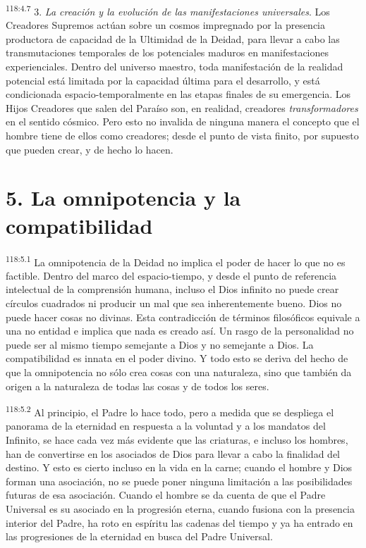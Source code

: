 \documentclass[twoside, 11pt]{book}
\begin{document}
\par
\textsuperscript{118:4.7} 3. \textit{La creación y la evolución de las manifestaciones universales}. Los Creadores Supremos actúan sobre un cosmos impregnado por la presencia productora de capacidad de la Ultimidad de la Deidad, para llevar a cabo las transmutaciones temporales de los potenciales maduros en manifestaciones experienciales. Dentro del universo maestro, toda manifestación de la realidad potencial está limitada por la capacidad última para el desarrollo, y está condicionada espacio-temporalmente en las etapas finales de su emergencia. Los Hijos Creadores que salen del Paraíso son, en realidad, creadores \textit{transformadores} en el sentido cósmico. Pero esto no invalida de ninguna manera el concepto que el hombre tiene de ellos como creadores; desde el punto de vista finito, por supuesto que pueden crear, y de hecho lo hacen.

\section*{5. La omnipotencia y la compatibilidad}
\par
\textsuperscript{118:5.1} La omnipotencia de la Deidad no implica el poder de hacer lo que no es factible. Dentro del marco del espacio-tiempo, y desde el punto de referencia intelectual de la comprensión humana, incluso el Dios infinito no puede crear círculos cuadrados ni producir un mal que sea inherentemente bueno. Dios no puede hacer cosas no divinas. Esta contradicción de términos filosóficos equivale a una no entidad e implica que nada es creado así. Un rasgo de la personalidad no puede ser al mismo tiempo semejante a Dios y no semejante a Dios. La compatibilidad es innata en el poder divino. Y todo esto se deriva del hecho de que la omnipotencia no sólo crea cosas con una naturaleza, sino que también da origen a la naturaleza de todas las cosas y de todos los seres.

\par
\textsuperscript{118:5.2} Al principio, el Padre lo hace todo, pero a medida que se despliega el panorama de la eternidad en respuesta a la voluntad y a los mandatos del Infinito, se hace cada vez más evidente que las criaturas, e incluso los hombres, han de convertirse en los asociados de Dios para llevar a cabo la finalidad del destino. Y esto es cierto incluso en la vida en la carne; cuando el hombre y Dios forman una asociación, no se puede poner ninguna limitación a las posibilidades futuras de esa asociación. Cuando el hombre se da cuenta de que el Padre Universal es su asociado en la progresión eterna, cuando fusiona con la presencia interior del Padre, ha roto en espíritu las cadenas del tiempo y ya ha entrado en las progresiones de la eternidad en busca del Padre Universal.
\end{document}
